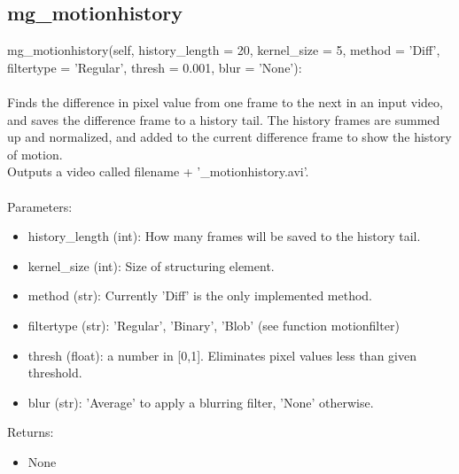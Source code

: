 \documentclass[9pt]{extarticle}
\begin{document}
\subsection{mg\_motionhistory} 
    mg\_motionhistory(self, history\_length = 20, kernel\_size = 5, method = 'Diff', filtertype = 'Regular', thresh = 0.001, blur = 'None'):
    \\\\
    Finds the difference in pixel value from one frame to the next in an input video, and saves the difference frame to a history tail. 
    The history frames are summed up and normalized, and added to the current difference frame to show the history of motion. \\
    Outputs a video called filename + '\_motionhistory.avi'.
\\\\
    Parameters:
    \begin{itemize}
    \item []history\_length (int): How many frames will be saved to the history tail.
    \item []kernel\_size (int): Size of structuring element.
    \item []method (str): Currently 'Diff' is the only implemented method. 
    \item []filtertype (str): 'Regular', 'Binary', 'Blob' (see function motionfilter) 
	\item []thresh (float): a number in [0,1]. Eliminates pixel values less than given threshold.
    \item []blur (str): 'Average' to apply a blurring filter, 'None' otherwise.
    \end{itemize}
    Returns:
    \begin{itemize}
    \item [] None
\end{itemize}
\end{document}
